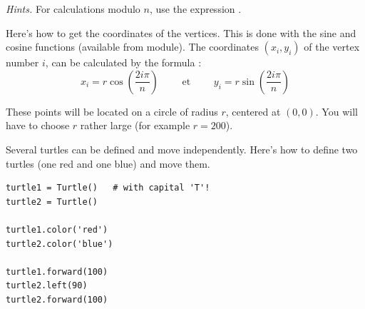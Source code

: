 \documentclass[11pt,class=report,crop=false]{standalone}
\begin{document}
\begin{activite}
\emph{Hints.} For calculations modulo $n$, use the expression .


Here's how to get the coordinates of the vertices. This is done with the sine and cosine functions (available from  module).
The coordinates $(x_i,y_i)$ of the vertex number $i$, can be calculated by the formula :
$$x_i = r \cos\left(\frac{2 i \pi}{n}\right) \qquad \text{ et } \qquad y_i = r\sin\left(\frac{2 i \pi}{n}\right)$$

These points will be located on a circle of radius $r$, centered at $(0,0)$. 
You will have to choose $r$ rather large (for example $r=200$).



\end{activite}


\begin{cours}

Several turtles can be defined and move independently.
Here's how to define two turtles (one red and one blue) and move them.

\begin{lstlisting}
turtle1 = Turtle()   # with capital 'T'!
turtle2 = Turtle()

turtle1.color('red')
turtle2.color('blue')

turtle1.forward(100)
turtle2.left(90)
turtle2.forward(100)
\end{lstlisting}

\end{cours}


\end{document}
